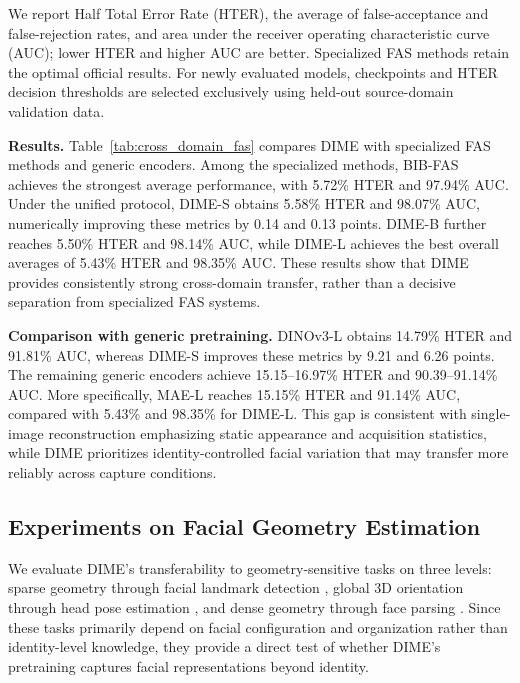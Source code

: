 \documentclass[10pt,journal,compsoc]{IEEEtran}
\begin{document}
We report Half Total Error Rate (HTER), the average of false-acceptance and false-rejection rates, and area under the receiver operating characteristic curve (AUC); lower HTER and higher AUC are better. Specialized FAS methods retain the optimal official results. For newly evaluated models, checkpoints and HTER decision thresholds are selected exclusively using held-out source-domain validation data.




\noindent\textbf{Results.} Table~\ref{tab:cross_domain_fas} compares DIME with specialized FAS methods and generic encoders. Among the specialized methods, BIB-FAS achieves the strongest average performance, with 5.72\% HTER and 97.94\% AUC. Under the unified protocol, DIME-S obtains 5.58\% HTER and 98.07\% AUC, numerically improving these metrics by 0.14 and 0.13 points. DIME-B further reaches 5.50\% HTER and 98.14\% AUC, while DIME-L achieves the best overall averages of 5.43\% HTER and 98.35\% AUC. These results show that DIME provides consistently strong cross-domain transfer, rather than a decisive separation from specialized FAS systems.

\noindent\textbf{Comparison with generic pretraining.} DINOv3-L obtains 14.79\% HTER and 91.81\% AUC, whereas DIME-S improves these metrics by 9.21 and 6.26 points. The remaining generic encoders achieve 15.15--16.97\% HTER and 90.39--91.14\% AUC. More specifically, MAE-L reaches 15.15\% HTER and 91.14\% AUC, compared with 5.43\% and 98.35\% for DIME-L. This gap is consistent with single-image reconstruction emphasizing static appearance and acquisition statistics, while DIME prioritizes identity-controlled facial variation that may transfer more reliably across capture conditions.


\subsection{Experiments on Facial Geometry Estimation}
\label{sec:exp_geometry}

We evaluate DIME's transferability to geometry-sensitive tasks on three levels: sparse geometry through facial landmark detection \cite{zhou2023star}, global 3D orientation through head pose estimation \cite{hempel20226d}, and dense geometry through face parsing \cite{te2021agrnet}. Since these tasks primarily depend on facial configuration and organization rather than identity-level knowledge, they provide a direct test of whether DIME's pretraining captures facial representations beyond identity.
\end{document}

